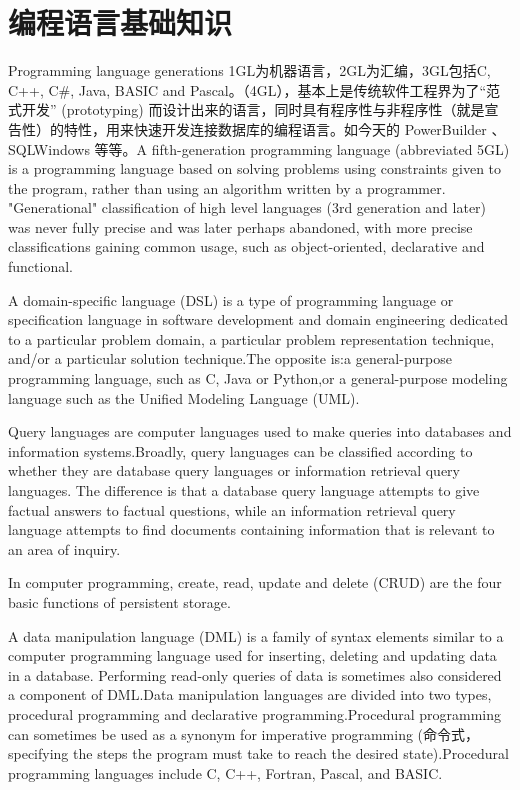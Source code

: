 \section{编程语言基础知识}

Programming language generations
 1GL为机器语言，2GL为汇编，3GL包括C, C++, C\#, Java, BASIC and Pascal。（4GL），基本上是传统软件工程界为了“范式开发” (prototyping) 而设计出来的语言，同时具有程序性与非程序性（就是宣告性）的特性，用来快速开发连接数据库的编程语言。如今天的 PowerBuilder 、 SQLWindows 等等。A fifth-generation programming language (abbreviated 5GL) is a programming language based on solving problems using constraints given to the program, rather than using an algorithm written by a programmer. "Generational" classification of high level languages (3rd generation and later) was never fully precise and was later perhaps abandoned, with more precise classifications gaining common usage, such as object-oriented, declarative and functional.

A domain-specific language (DSL) is a type of programming language or specification language in software development and domain engineering dedicated to a particular problem domain, a particular problem representation technique, and/or a particular solution technique.The opposite is:a general-purpose programming language, such as C, Java or Python,or a general-purpose modeling language such as the Unified Modeling Language (UML).


Query languages are computer languages used to make queries into databases and information systems.Broadly, query languages can be classified according to whether they are database query languages or information retrieval query languages. The difference is that a database query language attempts to give factual answers to factual questions, while an information retrieval query language attempts to find documents containing information that is relevant to an area of inquiry.

In computer programming, create, read, update and delete (CRUD) are the four basic functions of persistent storage.

A data manipulation language (DML) is a family of syntax elements similar to a computer programming language used for inserting, deleting and updating data in a database. Performing read-only queries of data is sometimes also considered a component of DML.Data manipulation languages are divided into two types, procedural programming and declarative programming.Procedural programming can sometimes be used as a synonym for imperative programming (命令式，specifying the steps the program must take to reach the desired state).Procedural programming languages include C, C++, Fortran, Pascal, and BASIC.


